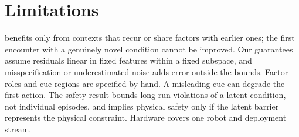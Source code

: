 \section{Limitations}\label{sec:limitations}

\method benefits only from contexts that recur or share factors with earlier ones; the first encounter with a genuinely novel condition cannot be improved. Our guarantees assume residuals linear in fixed features within a fixed subspace, and misspecification or underestimated noise adds error outside the bounds. Factor roles and cue regions are specified by hand. A misleading cue can degrade the first action. The safety result bounds long-run violations of a latent condition, not individual episodes, and implies physical safety only if the latent barrier represents the physical constraint. Hardware covers one robot and deployment stream.
